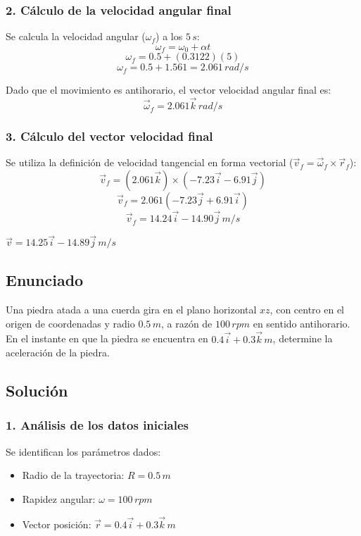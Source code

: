 \documentclass[12pt, a4paper]{article}
\begin{document}
\subsubsection*{2. Cálculo de la velocidad angular final}
Se calcula la velocidad angular ($\omega_f$) a los $5 \, \si{s}$:
$$ \omega_f = \omega_0 + \alpha t $$
$$ \omega_f = 0.5 + (0.3122)(5) $$
$$ \omega_f = 0.5 + 1.561 = 2.061 \, \si{rad/s} $$

Dado que el movimiento es antihorario, el vector velocidad angular final es:
$$ \vec{\omega}_f = 2.061\vec{k} \, \si{rad/s} $$

\subsubsection*{3. Cálculo del vector velocidad final}
Se utiliza la definición de velocidad tangencial en forma vectorial ($\vec{v}_f = \vec{\omega}_f \times \vec{r}_f$):
$$ \vec{v}_f = (2.061\vec{k}) \times (-7.23\vec{i} - 6.91\vec{j}) $$
$$ \vec{v}_f = 2.061(-7.23\vec{j} + 6.91\vec{i}) $$
$$ \vec{v}_f = 14.24\vec{i} - 14.90\vec{j} \, \si{m/s} $$

\begin{tcolorbox}[colback=green!5!white, colframe=green!50!black, title=Respuesta Final]
\centering \Large $\vec{v} = 14.25\vec{i} - 14.89\vec{j} \, \si{m/s}$
\end{tcolorbox}

\newpage

\subsection*{Enunciado}
Una piedra atada a una cuerda gira en el plano horizontal $xz$, con centro en el origen de coordenadas y radio $0.5 \, \si{m}$, a razón de $100 \, \si{rpm}$ en sentido antihorario. En el instante en que la piedra se encuentra en $0.4\vec{i} + 0.3\vec{k} \, \si{m}$, determine la aceleración de la piedra.

\subsection*{Solución}

\subsubsection*{1. Análisis de los datos iniciales}
Se identifican los parámetros dados:
\begin{itemize}
    \item Radio de la trayectoria: $R = 0.5 \, \si{m}$
    \item Rapidez angular: $\omega = 100 \, \si{rpm}$
    \item Vector posición: $\vec{r} = 0.4\vec{i} + 0.3\vec{k} \, \si{m}$
\end{itemize}
\end{document}
